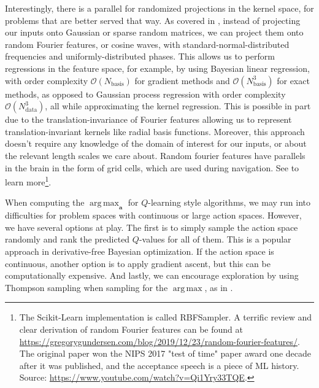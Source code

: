 \documentclass{article}
\DeclareMathOperator*{\argmax}{arg\,max}
\begin{document}
Interestingly, there is a parallel for randomized projections in the kernel space, for problems that are better served that way. As covered in \cite{GP_BLR}, instead of projecting our inputs onto Gaussian or sparse random matrices, we can project them onto random Fourier features, or cosine waves, with standard-normal-distributed frequencies and uniformly-distributed phases. This allows us to perform regressions in the feature space, for example, by using Bayesian linear regression, with order complexity $\mathcal{O}(N_\text{basis})$ for gradient methods and  $\mathcal{O}(N_\text{basis}^3)$ for exact methods, as opposed to Gaussian process regression with order complexity $\mathcal{O}(N_\text{data}^3)$, all while approximating the kernel regression. This is possible in part due to the translation-invariance of Fourier features allowing us to represent translation-invariant kernels like radial basis functions. Moreover, this approach doesn't require any knowledge of the domain of interest for our inputs, or about the relevant length scales we care about. Random fourier features have parallels in the brain in the form of grid cells\cite{grid_cells}, which are used during navigation. See \cite{random_fourier_features} to learn more\footnote{The Scikit-Learn implementation is called RBFSampler. A terrific review and clear derivation of random Fourier features can be found at \url{https://gregorygundersen.com/blog/2019/12/23/random-fourier-features/}. The original paper won the NIPS 2017 "test of time" paper award one decade after it was published, and the acceptance speech is a piece of ML history. Source:  \url{https://www.youtube.com/watch?v=Qi1Yry33TQE}.}.

When computing the $\argmax_\mathbf{a}$ for $Q$-learning style algorithms, we may run into difficulties for problem spaces with continuous or large action spaces. However, we have several options at play. The first is to simply sample the action space randomly and rank the predicted $Q$-values for all of them. This is a popular approach in derivative-free Bayesian optimization. If the action space is continuous, another option is to apply gradient ascent, but this can be computationally expensive. And lastly, we can encourage exploration by using Thompson sampling when sampling for the $\argmax$, as in \cite{RLSVI}.
\end{document}
